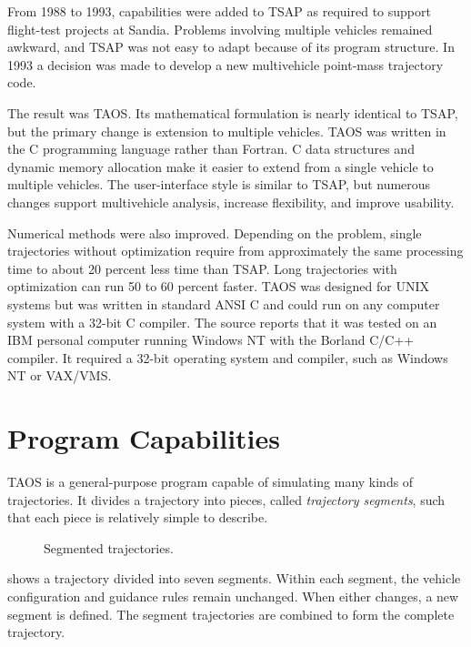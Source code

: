From 1988 to 1993, capabilities were added to TSAP as required to support flight-test
projects at Sandia. Problems involving multiple vehicles remained awkward, and TSAP
was not easy to adapt because of its program structure. In 1993 a decision was made
to develop a new multivehicle point-mass trajectory code.

The result was TAOS. Its mathematical formulation is nearly identical to TSAP, but
the primary change is extension to multiple vehicles. TAOS was written in the C
programming language rather than Fortran. C data structures and dynamic memory
allocation make it easier to extend from a single vehicle to multiple vehicles. The
user-interface style is similar to TSAP, but numerous changes support multivehicle
analysis, increase flexibility, and improve usability.

Numerical methods were also improved. Depending on the problem, single trajectories
without optimization require from approximately the same processing time to about
20 percent less time than TSAP. Long trajectories with optimization can run 50 to 60
percent faster. TAOS was designed for UNIX systems but was written in standard ANSI
C and could run on any computer system with a 32-bit C compiler. The source reports
that it was tested on an IBM personal computer running Windows NT with the Borland
C/C++ compiler. It required a 32-bit operating system and compiler, such as Windows
NT or VAX/VMS.

\section{Program Capabilities}\label{sec:program-capabilities}

TAOS is a general-purpose program capable of simulating many kinds of trajectories.
It divides a trajectory into pieces, called \emph{trajectory segments}, such that each
piece is relatively simple to describe.

\begin{figure}[htbp]
  \centering
  \resizebox{0.96\linewidth}{!}{}
  \caption{Segmented trajectories.}
  \label{fig:segmented-trajectories}
\end{figure}

 shows a trajectory divided into seven segments.
Within each segment, the vehicle configuration and guidance rules remain unchanged.
When either changes, a new segment is defined. The segment trajectories are combined
to form the complete trajectory.

